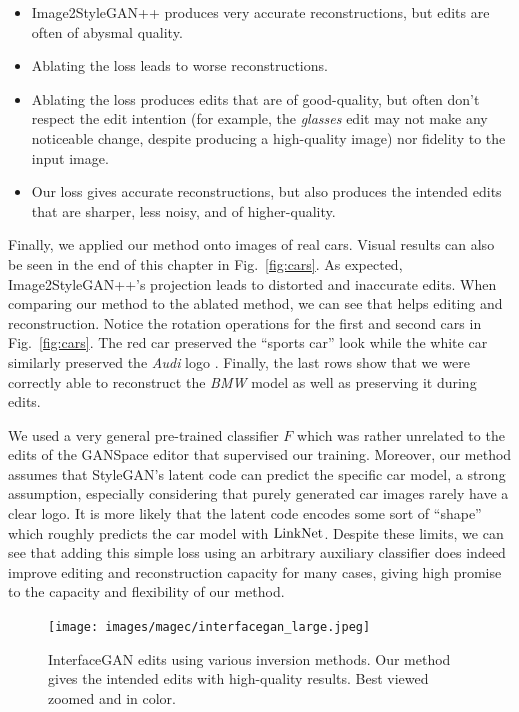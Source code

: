 \begin{itemize}
    \item Image2StyleGAN++ \citep{abdal2020} produces very accurate reconstructions, but edits are often of abysmal quality.
    \item Ablating the \magec loss leads to worse reconstructions.
    \item Ablating the \magec loss produces edits that are of good-quality, but often don't respect the edit intention (for example, the \emph{glasses} edit may not make any noticeable change, despite producing a high-quality image) nor fidelity to the input image.
    \item Our \magec loss gives accurate reconstructions, but also produces the intended edits that are sharper, less noisy, and of higher-quality.
\end{itemize}




Finally, we applied our method onto images of real cars. Visual results 
can also be seen in the end of this chapter in Fig.~\ref{fig:cars}. As expected, 
Image2StyleGAN++'s projection leads to distorted and inaccurate 
edits. When comparing our method to the ablated method, we can 
see that \magec helps editing and reconstruction. Notice the 
rotation operations for the first and second cars in 
Fig.~\ref{fig:cars}. The red car preserved the ``sports car'' 
look while the white car similarly preserved the \emph{Audi} 
logo .  Finally, the last rows show that we were correctly able 
to reconstruct the \emph{BMW} model as well as preserving it 
during edits.

We used a very general pre-trained classifier $F$ which was 
rather unrelated to the edits of the GANSpace editor that 
supervised our training. Moreover, our method assumes that 
StyleGAN's latent code can predict the specific car model, a 
strong assumption, especially considering that purely generated 
car images rarely have a clear logo. It is more likely that the 
latent code encodes some sort of ``shape'' which roughly predicts
 the car model with $\mathrm{LinkNet}$. Despite these limits, we can see that
  adding this simple \magec loss using an arbitrary auxiliary 
  classifier does indeed improve editing and reconstruction 
  capacity for many cases, giving high promise to the capacity and
   flexibility of our method.




   \begin{figure}
    \centering
      \texttt{[image: images/magec/interfacegan\_large.jpeg]}
      \caption{InterfaceGAN \citep{shen2020} edits using various inversion methods.  Our method gives the intended edits with high-quality results. Best viewed zoomed and in color.}
      \label{fig:interfacegan_supp}
  \end{figure}
  
